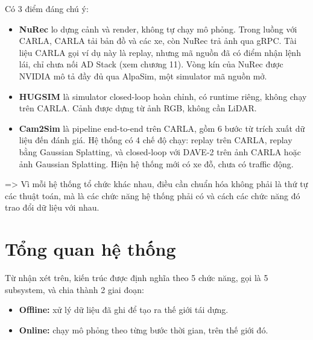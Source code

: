 Có 3 điểm đáng chú ý:
\begin{itemize}
  \item \textbf{NuRec} lo dựng cảnh và render, không tự chạy mô phỏng. Trong luồng với CARLA, CARLA tải bản đồ và các xe, còn NuRec trả ảnh qua gRPC. Tài liệu CARLA gọi ví dụ này là replay, nhưng mã nguồn đã có điểm nhận lệnh lái, chỉ chưa nối AD Stack (xem chương 11). Vòng kín của NuRec được NVIDIA mô tả đầy đủ qua AlpaSim, một simulator mã nguồn mở.
  \item \textbf{HUGSIM} là simulator closed-loop hoàn chỉnh, có runtime riêng, không chạy trên CARLA. Cảnh được dựng từ ảnh RGB, không cần LiDAR.
  \item \textbf{Cam2Sim} là pipeline end-to-end trên CARLA, gồm 6 bước từ trích xuất dữ liệu đến đánh giá. Hệ thống có 4 chế độ chạy: replay trên CARLA, replay bằng Gaussian Splatting, và closed-loop với DAVE-2 trên ảnh CARLA hoặc ảnh Gaussian Splatting. Hiện hệ thống mới có xe đỗ, chưa có traffic động.
\end{itemize}

=> Vì mỗi hệ thống tổ chức khác nhau, điều cần chuẩn hóa không phải là thứ tự các thuật toán, mà là các chức năng hệ thống phải có và cách các chức năng đó trao đổi dữ liệu với nhau.

\section{Tổng quan hệ thống}

Từ nhận xét trên, kiến trúc được định nghĩa theo 5 chức năng, gọi là 5 subsystem, và chia thành 2 giai đoạn:
\begin{itemize}
  \item \textbf{Offline:} xử lý dữ liệu đã ghi để tạo ra thế giới tái dựng.
  \item \textbf{Online:} chạy mô phỏng theo từng bước thời gian, trên thế giới đó.
\end{itemize}


